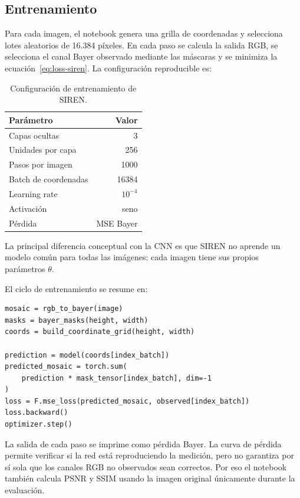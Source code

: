 \documentclass[11pt,a4paper]{article}
\begin{document}
\subsection{Entrenamiento}

Para cada imagen, el notebook genera una grilla de coordenadas y selecciona lotes aleatorios de 16.384 píxeles. En cada paso se calcula la salida RGB, se selecciona el canal Bayer observado mediante las máscaras y se minimiza la ecuación~\eqref{eq:loss-siren}. La configuración reproducible es:

\begin{table}[H]
\centering
\caption{Configuración de entrenamiento de SIREN.}
\label{tab:siren-config}
\begin{tabular}{lr}
\toprule
Parámetro & Valor\\
\midrule
Capas ocultas & 3\\
Unidades por capa & 256\\
Pasos por imagen & 1000\\
Batch de coordenadas & 16384\\
Learning rate & $10^{-4}$\\
Activación & seno\\
Pérdida & MSE Bayer\\
\bottomrule
\end{tabular}
\end{table}

La principal diferencia conceptual con la CNN es que SIREN no aprende un modelo común para todas las imágenes: cada imagen tiene sus propios parámetros $\theta$.

El ciclo de entrenamiento se resume en:

\begin{lstlisting}[caption={Ajuste físico de una SIREN para una imagen.},label={lst:siren-training}]
mosaic = rgb_to_bayer(image)
masks = bayer_masks(height, width)
coords = build_coordinate_grid(height, width)

prediction = model(coords[index_batch])
predicted_mosaic = torch.sum(
    prediction * mask_tensor[index_batch], dim=-1
)
loss = F.mse_loss(predicted_mosaic, observed[index_batch])
loss.backward()
optimizer.step()
\end{lstlisting}

La salida de cada paso se imprime como pérdida Bayer. La curva de pérdida permite verificar si la red está reproduciendo la medición, pero no garantiza por sí sola que los canales RGB no observados sean correctos. Por eso el notebook también calcula PSNR y SSIM usando la imagen original únicamente durante la evaluación.
\end{document}
